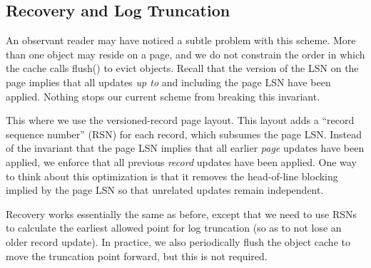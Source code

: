 \documentclass[10pt,letterpaper,twocolumn,english]{article}
\newcommand{\yad}{Lemon\xspace}
\begin{document}
\subsection{Recovery and Log Truncation}

An observant reader may have noticed a subtle problem with this
scheme.  More than one object may reside on a page, and we do not
constrain the order in which the cache calls flush() to evict objects.
Recall that the version of the LSN on the page implies that all
updates {\em up to} and including the page LSN have been applied.
Nothing stops our current scheme from breaking this invariant.  

This where we use the versioned-record page layout. This layout adds a
``record sequence number'' (RSN) for each record, which subsumes the
page LSN.  Instead of the invariant that the page LSN implies that all
earlier {\em page} updates have been applied, we enforce that all
previous {\em record} updates have been applied.  One way to think about
this optimization is that it removes the head-of-line blocking implied
by the page LSN so that unrelated updates remain independent.

Recovery works essentially the same as before, except that we need to
use RSNs to calculate the earliest allowed point for log truncation
(so as to not lose an older record update).  In practice, we
also periodically flush the object cache to move the truncation point
forward, but this is not required.



\end{document}
